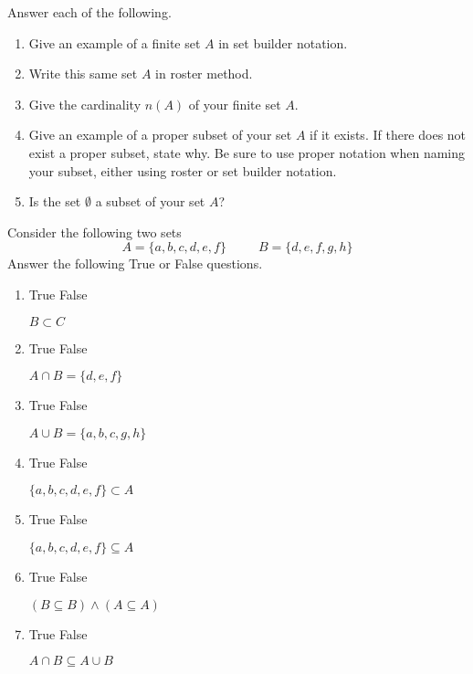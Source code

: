 \documentclass[addpoints,12pt]{exam}
\newcommand{\tft}{
\begin{oneparcheckboxes}
\CorrectChoice True
\choice False
	\end{oneparcheckboxes}
}
\newcommand{\tff}{
\begin{oneparcheckboxes}
\choice True
\CorrectChoice False
	\end{oneparcheckboxes}
}
\begin{document}
\begin{center}
\end{center}
\vspace{0.1in}
\vspace{0.2in}




\begin{questions}
	\question Answer each of the following. \begin{enumerate}[label=\alph*)]
	    \item Give an example of a finite set $A$ in set builder notation. 
			\item Write this same set $A$ in roster method. 
			\item Give the cardinality $n(A)$ of your finite set $A$. 
			\item Give an example of a proper subset of your set $A$ if it exists. If there does not exist a proper subset, state why. Be sure to use proper notation when naming your subset, either using roster or set builder notation. 
			\item Is the set $\emptyset$ a subset of your set $A$?
	\end{enumerate}
	\question Consider the following two sets 
	\[
	A=\{a,b,c,d,e,f\} \hspace{30pt} B = \{d,e,f,g,h\}
	\]
	Answer the following True or False questions. 
	\begin{enumerate}[label = \alph*)]
		\item \tff $B\subset C$
		\item \tft $A\cap B = \{d,e,f\}$
		\item \tff $A\cup B = \{a,b,c,g,h\}$
		\item \tff $\{a,b,c,d,e,f\}\subset A$
		\item \tft $\{a,b,c,d,e,f\} \subseteq A$ 
		\item \tft $(B\subseteq B)\wedge (A\subseteq A)$ 
		\item \tft $A\cap B \subseteq A\cup B$
	\end{enumerate}
	\question
\end{questions}
\end{document}
